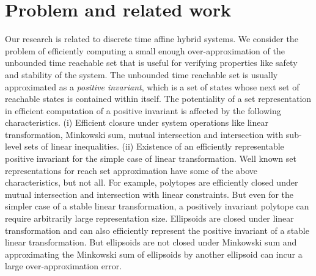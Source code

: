 \documentclass[11pt,a4paper,twoside,openright]{article}
\begin{document}
\section{Problem and related work}
Our research is related to discrete time affine hybrid systems.  We
consider the problem of efficiently computing a small enough
over-approximation of the unbounded time reachable set that is useful
for verifying properties like safety and stability of the system.  The
unbounded time reachable set is usually approximated as a {\it
  positive invariant}, which is a set of states whose next set of
reachable states is contained within itself.  The potentiality of a
set representation in efficient computation of a positive invariant
is affected by the following characteristics.  (i) Efficient closure
under system operations like linear transformation, Minkowski sum,
mutual intersection and intersection with sub-level sets of linear
inequalities.  (ii) Existence of an efficiently representable positive
invariant for the simple case of linear transformation.  Well known
set representations for reach set approximation have some of the above
characteristics, but not all.  For example, polytopes are efficiently
closed under mutual intersection and intersection with linear
constraints.  But even for the simpler case of a stable linear
transformation, a positively invariant polytope can require
arbitrarily large representation size.  Ellipsoids are closed under
linear transformation and can also efficiently represent the positive
invariant of a stable linear transformation.  But ellipsoids are not
closed under Minkowski sum and approximating the Minkowski sum of
ellipsoids by another ellipsoid can incur a large over-approximation
error.
\end{document}
